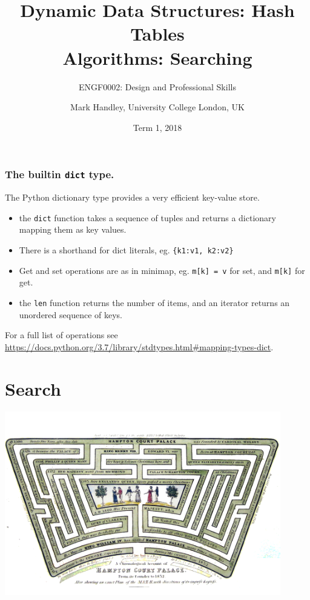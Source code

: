 \documentclass{beamer} %
\author{Mark Handley, University College London, UK}
\title{Dynamic Data Structures: Hash Tables\\Algorithms: Searching}
\subtitle{ENGF0002: Design and Professional Skills }
\date{Term 1, 2018}
\begin{document}
\nobibliography*


\frame{
\titlepage
}

\begin{frame}
\frametitle{The builtin \texttt{dict} type.}

The Python dictionary type provides a very efficient key-value store.
\begin{itemize}
  \item the \texttt{dict} function takes a sequence of tuples and returns a dictionary mapping them as key values.
  \item There is a shorthand for dict literals, eg. \texttt{\{k1:v1, k2:v2\}}
  \item Get and set operations are as in minimap, eg. \texttt{m[k] = v} for set, and \texttt{m[k]} for get.
  \item the \texttt{len} function returns the number of items, and an iterator returns an unordered sequence of keys.
\end{itemize}

\vspace{3mm} 
For a full list of operations see \url{https://docs.python.org/3.7/library/stdtypes.html\#mapping-types-dict}.
\end{frame}



\section{Search}

\begin{frame}
  \centering
  \includegraphics[height=80mm]{assets/hampton1.png}
\end{frame}
\end{document}
